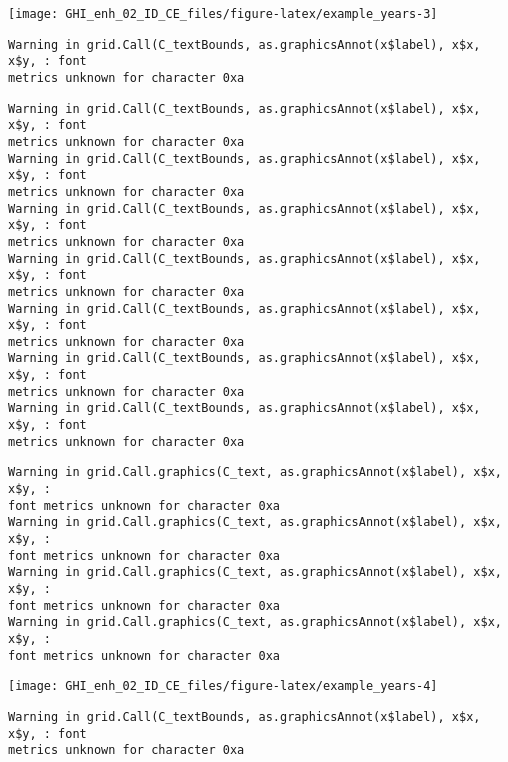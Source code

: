 \documentclass[
  10pt,
  a4paper,oneside]{article}
\begin{document}
\begin{center}\texttt{[image: GHI\_enh\_02\_ID\_CE\_files/figure-latex/example\_years-3]} \end{center}

\begin{verbatim}
Warning in grid.Call(C_textBounds, as.graphicsAnnot(x$label), x$x, x$y, : font
metrics unknown for character 0xa
\end{verbatim}

\begin{verbatim}
Warning in grid.Call(C_textBounds, as.graphicsAnnot(x$label), x$x, x$y, : font
metrics unknown for character 0xa
Warning in grid.Call(C_textBounds, as.graphicsAnnot(x$label), x$x, x$y, : font
metrics unknown for character 0xa
Warning in grid.Call(C_textBounds, as.graphicsAnnot(x$label), x$x, x$y, : font
metrics unknown for character 0xa
Warning in grid.Call(C_textBounds, as.graphicsAnnot(x$label), x$x, x$y, : font
metrics unknown for character 0xa
Warning in grid.Call(C_textBounds, as.graphicsAnnot(x$label), x$x, x$y, : font
metrics unknown for character 0xa
Warning in grid.Call(C_textBounds, as.graphicsAnnot(x$label), x$x, x$y, : font
metrics unknown for character 0xa
Warning in grid.Call(C_textBounds, as.graphicsAnnot(x$label), x$x, x$y, : font
metrics unknown for character 0xa
\end{verbatim}

\begin{verbatim}
Warning in grid.Call.graphics(C_text, as.graphicsAnnot(x$label), x$x, x$y, :
font metrics unknown for character 0xa
Warning in grid.Call.graphics(C_text, as.graphicsAnnot(x$label), x$x, x$y, :
font metrics unknown for character 0xa
Warning in grid.Call.graphics(C_text, as.graphicsAnnot(x$label), x$x, x$y, :
font metrics unknown for character 0xa
Warning in grid.Call.graphics(C_text, as.graphicsAnnot(x$label), x$x, x$y, :
font metrics unknown for character 0xa
\end{verbatim}

\begin{center}\texttt{[image: GHI\_enh\_02\_ID\_CE\_files/figure-latex/example\_years-4]} \end{center}

\begin{verbatim}
Warning in grid.Call(C_textBounds, as.graphicsAnnot(x$label), x$x, x$y, : font
metrics unknown for character 0xa
\end{verbatim}
\end{document}
